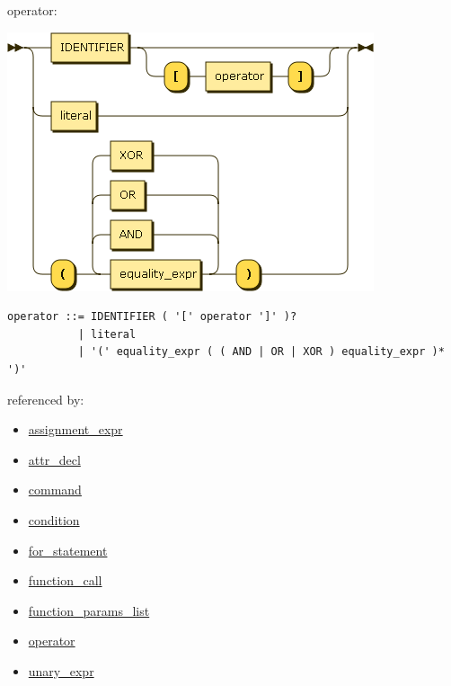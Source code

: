 \begin{minipage}{\textwidth}
\protect\hypertarget{operator}{}{operator:}

\includegraphics[width=4.25000in,height=3.00000in]{diagram/operator.png}

\begin{verbatim}
operator ::= IDENTIFIER ( '[' operator ']' )?
           | literal
           | '(' equality_expr ( ( AND | OR | XOR ) equality_expr )* ')'
\end{verbatim}

referenced by:

\begin{itemize}
\tightlist
\item
  \protect\hyperlink{assignment_expr}{assignment\_expr}
\item
  \protect\hyperlink{attr_decl}{attr\_decl}
\item
  \protect\hyperlink{command}{command}
\item
  \protect\hyperlink{condition}{condition}
\item
  \protect\hyperlink{for_statement}{for\_statement}
\item
  \protect\hyperlink{function_call}{function\_call}
\item
  \protect\hyperlink{function_params_list}{function\_params\_list}
\item
  \protect\hyperlink{operator}{operator}
\item
  \protect\hyperlink{unary_expr}{unary\_expr}
\end{itemize}

\end{minipage}

